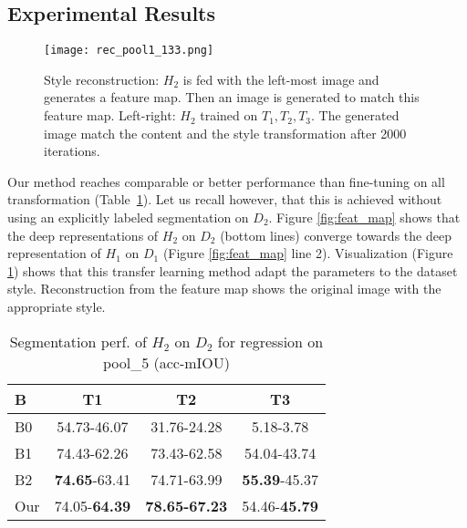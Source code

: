 \documentclass{bmvc2k}
\begin{document}
\subsection{Experimental Results}

\begin{figure}[thb]
  \centering
  \texttt{[image: rec\_pool1\_133.png]}
  \caption{Style reconstruction: $H_2$ is fed with the left-most image and generates a feature map. Then an image is generated to match this feature map. Left-right: $H_2$ trained on $T_1, T_2, T_3$. The generated image match the content and the style transformation after 2000 iterations.}
  \label{fig:rec_pool5_53}
\end{figure}

Our method reaches comparable or better performance than fine-tuning on all transformation 
(Table~\ref{tab:res_pool5}). Let us recall however, that this is achieved without using an explicitly labeled segmentation on $D_2$.
Figure \ref{fig:feat_map} shows that the deep representations of $H_2$ on $D_2$ 
(bottom lines) converge towards the deep representation of $H_1$ on $D_1$ (Figure \ref{fig:feat_map} line 2).
Visualization (Figure \ref{fig:rec_pool5_53}) shows that this transfer learning method 
adapt the parameters to the dataset style. Reconstruction from the feature map 
shows the original image with the appropriate style.  

\begin{table}[tbh]
\begin{center}
\begin{tabular}{|l|c|c|c|}
\hline
B  & T1 & T2 & T3 \\
\hline
B0  &54.73-46.07&31.76-24.28&5.18-3.78\\
\hline
B1  &74.43-62.26&73.43-62.58&54.04-43.74\\
\hline
B2  &\textbf{74.65}-63.41&74.71-63.99&\textbf{55.39}-45.37\\
\hline
Our &74.05-\textbf{64.39}&\textbf{78.65-67.23} &54.46-\textbf{45.79}\\
\hline
\end{tabular}
\end{center}
  \caption{Segmentation perf. of $H_2$ on $D_2$ for regression on pool\_5 (acc-mIOU)}
\label{tab:res_pool5}
\end{table}
\end{document}
